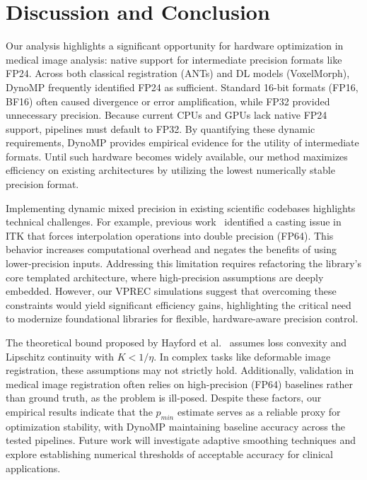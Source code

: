 \documentclass[runningheads]{llncs}
\begin{document}
\section{Discussion and Conclusion}
Our analysis highlights a significant opportunity for hardware optimization in medical image analysis: native support for intermediate precision formats like FP24. Across both classical registration (ANTs) and DL models (VoxelMorph), DynoMP frequently identified FP24 as sufficient. Standard 16-bit formats (FP16, BF16) often caused divergence or error amplification, while FP32 provided unnecessary precision. Because current CPUs and GPUs lack native FP24 support, pipelines must default to FP32. By quantifying these dynamic requirements, DynoMP provides empirical evidence for the utility of intermediate formats. Until such hardware becomes widely available, our method maximizes efficiency on existing architectures by utilizing the lowest numerically stable precision format.

Implementing dynamic mixed precision in existing scientific codebases highlights technical challenges. For example, previous work~\cite{Dugre2025-fs} identified a casting issue in ITK that forces interpolation operations into double precision (FP64). This behavior increases computational overhead and negates the benefits of using lower-precision inputs.
Addressing this limitation requires refactoring the library's core templated architecture, where high-precision assumptions are deeply embedded. However, our VPREC simulations suggest that overcoming these constraints would yield significant efficiency gains, highlighting the critical need to modernize foundational libraries for flexible, hardware-aware precision control.

The theoretical bound proposed by Hayford et al.~\cite{Hayford2024-kb} assumes
loss convexity and Lipschitz continuity with $K<1/\eta$. In complex tasks
like deformable image registration, these assumptions may not strictly hold.
Additionally, validation in medical image registration often relies on
high-precision (FP64) baselines rather than ground truth, as the problem is
ill-posed. Despite these factors, our empirical results indicate that the
$p_{min}$ estimate serves as a reliable proxy for optimization stability, with
DynoMP maintaining baseline accuracy across the tested pipelines. Future work
will investigate adaptive smoothing techniques and explore establishing
numerical thresholds of acceptable accuracy for clinical applications.
\end{document}
